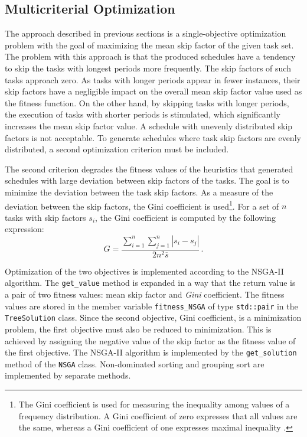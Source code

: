 \subsection{Multicriterial Optimization}
The approach described in previous sections is a single-objective optimization problem with the goal of maximizing the mean skip factor of the given task set.
The problem with this approach is that the produced schedules have a tendency to skip the tasks with longest periods more frequently.
The skip factors of such tasks approach zero.
As tasks with longer periods appear in fewer instances, their skip factors have a negligible impact on the overall mean skip factor value used as the fitness function.
On the other hand, by skipping tasks with longer periods, the execution of tasks with shorter periods is stimulated, which significantly increases the mean skip factor value.
A schedule with unevenly distributed skip factors is not acceptable.
To generate schedules where task skip factors are evenly distributed, a second optimization criterion must be included.

The second criterion degrades the fitness values of the heuristics that generated schedules with large deviation between skip factors of the tasks.
The goal is to minimize the deviation between the task skip factors.
As a measure of the deviation between the skip factors, the Gini coefficient is used\footnote{The Gini coefficient is used for measuring the inequality among values of a frequency distribution. A Gini coefficient of zero expresses that all values are the same, whereas a Gini coefficient of one expresses maximal inequality \cite{gini1912variabilita}.}.
For a set of $n$ tasks with skip factors $s_i$, the Gini coefficient is computed by the following expression:
\begin{equation*}
G = \frac{\sum_{i=1}^{n}\sum_{j=1}^{n}|s_i - s_j|}{2n^2\overline{s}} \, .
\end{equation*}

Optimization of the two objectives is implemented according to the NSGA-II algorithm.
The \texttt{get\_value} method is expanded in a way that the return value is a pair of two fitness values: mean skip factor and \textit{Gini} coefficient.
The fitness values are stored in the member variable \texttt{fitness\_NSGA} of type \texttt{std::pair} in the \texttt{TreeSolution} class.
Since the second objective, Gini coefficient, is a minimization problem, the first objective must also be reduced to minimization.
This is achieved by assigning the negative value of the skip factor as the fitness value of the first objective.
The NSGA-II algorithm is implemented by the \texttt{get\_solution} method of the \texttt{NSGA} class.
Non-dominated sorting and grouping sort are implemented by separate methods.

